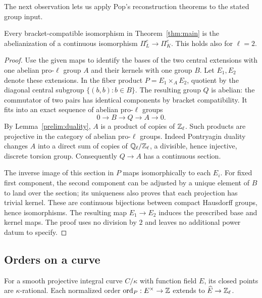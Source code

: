 The next observation lets us apply Pop's reconstruction theorems to
the stated group input.

\begin{lemma}
\label{prelim:central-lift}
Every bracket-compatible isomorphism in Theorem~\ref{thm:main} is the
abelianization of a continuous isomorphism $\Pi_L^c\to\Pi_K^c$.
This holds also for $\ell=2$.
\end{lemma}
\begin{proof}
Use the given maps to identify the bases of the two central extensions
with one abelian pro-$\ell$ group $A$ and their kernels with one group
$B$.  Let $E_1,E_2$ denote these extensions.  In the fiber product
$P=E_1\times_A E_2$, quotient by the diagonal central subgroup
$\{(b,b):b\in B\}$.  The resulting group $Q$ is abelian: the
commutator of two pairs has identical components by bracket
compatibility.  It fits into an exact sequence of abelian pro-$\ell$
groups
\[
 0\longrightarrow B\longrightarrow Q\longrightarrow A\longrightarrow0.
\]
By Lemma~\ref{prelim:duality}, $A$ is a product of copies of $\mathbb Z_\ell$.
Such products are projective in the category of abelian pro-$\ell$
groups.  Indeed Pontryagin duality changes $A$ into a direct sum of
copies of $\mathbb Q_\ell/\mathbb Z_\ell$, a divisible, hence injective,
discrete torsion group.  Consequently $Q\to A$ has a continuous
section.

The inverse image of this section in $P$ maps isomorphically to each
$E_i$.  For fixed first component, the second component can be adjusted
by a unique element of $B$ to land over the section; its uniqueness
also proves that each projection has trivial kernel.  These are
continuous bijections between compact Hausdorff groups, hence
isomorphisms.  The resulting map $E_1\to E_2$ induces the prescribed
base and kernel maps.  The proof uses no division by $2$ and leaves
no additional power datum to specify.
\end{proof}

\subsection{Orders on a curve}
For a smooth projective integral curve $C/\kappa$ with function field
$E$, its closed points are $\kappa$-rational.  Each normalized order
$\operatorname{ord}_P:E^\times\to\mathbb Z$ extends to $\widehat E\to\mathbb Z_\ell$.

